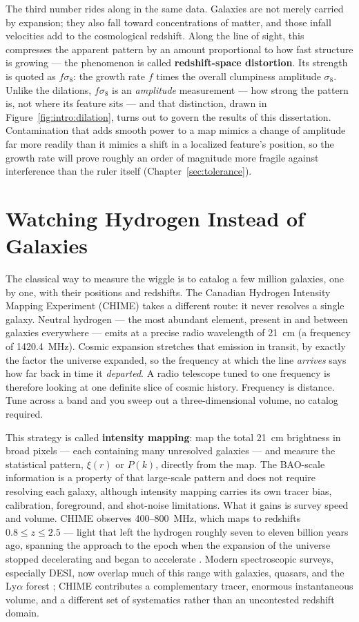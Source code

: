 The third number rides along in the same data. Galaxies are not merely carried by expansion; they also fall toward concentrations of matter, and those infall velocities add to the cosmological redshift. Along the line of sight, this compresses the apparent pattern by an amount proportional to how fast structure is growing \cite{kaiser1987} --- the phenomenon is called \textbf{redshift-space distortion}. Its strength is quoted as $f\sigma_8$: the growth rate $f$ times the overall clumpiness amplitude $\sigma_8$. Unlike the dilations, $f\sigma_8$ is an \emph{amplitude} measurement --- how strong the pattern is, not where its feature sits --- and that distinction, drawn in Figure~\ref{fig:intro:dilation}, turns out to govern the results of this dissertation. Contamination that adds smooth power to a map mimics a change of amplitude far more readily than it mimics a shift in a localized feature's position, so the growth rate will prove roughly an order of magnitude more fragile against interference than the ruler itself (Chapter~\ref{sec:tolerance}).

\section{Watching Hydrogen Instead of Galaxies}
\label{sec:intro:hydrogen}

The classical way to measure the wiggle is to catalog a few million galaxies, one by one, with their positions and redshifts. The Canadian Hydrogen Intensity Mapping Experiment (CHIME) takes a different route: it never resolves a single galaxy. Neutral hydrogen --- the most abundant element, present in and between galaxies everywhere --- emits at a precise radio wavelength of 21~cm (a frequency of 1420.4~MHz). Cosmic expansion stretches that emission in transit, by exactly the factor the universe expanded, so the frequency at which the line \emph{arrives} says how far back in time it \emph{departed}. A radio telescope tuned to one frequency is therefore looking at one definite slice of cosmic history. Frequency is distance. Tune across a band and you sweep out a three-dimensional volume, no catalog required.

This strategy is called \textbf{intensity mapping}: map the total 21~cm brightness in broad pixels --- each containing many unresolved galaxies --- and measure the statistical pattern, $\xi(r)$ or $P(k)$, directly from the map. The BAO-scale information is a property of that large-scale pattern and does not require resolving each galaxy, although intensity mapping carries its own tracer bias, calibration, foreground, and shot-noise limitations. What it gains is survey speed and volume. CHIME observes 400--800~MHz, which maps to redshifts $0.8 \le z \le 2.5$ --- light that left the hydrogen roughly seven to eleven billion years ago, spanning the approach to the epoch when the expansion of the universe stopped decelerating and began to accelerate \cite{amiri2022chime}. Modern spectroscopic surveys, especially DESI, now overlap much of this range with galaxies, quasars, and the Ly$\alpha$ forest \cite{desi2024iii,desi2024lya}; CHIME contributes a complementary tracer, enormous instantaneous volume, and a different set of systematics rather than an uncontested redshift domain.

